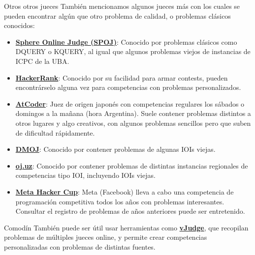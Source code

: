 \documentclass{beamer}
\begin{document}
    \begin{frame}{Otros otros jueces}
        También mencionamos algunos jueces más con los cuales se pueden encontrar algún que otro problema de calidad, o problemas clásicos conocidos: \pause

        \begin{itemize}
            \item \textbf{\textcolor{blue}{\href{https://www.spoj.com/}{Sphere Online Judge (SPOJ)}}}: Conocido por problemas clásicos como DQUERY o KQUERY, al igual que algunos problemas viejos de instancias de ICPC de la UBA.
            \item \textbf{\textcolor{blue}{\href{https://www.hackerrank.com/contests}{HackerRank}}}: Conocido por su facilidad para armar contests, pueden encontrárselo alguna vez para competencias con problemas personalizados.
            \item \textbf{\textcolor{blue}{\href{https://atcoder.jp/}{AtCoder}}}: Juez de origen japonés con competencias regulares los sábados o domingos a la mañana (hora Argentina). Suele contener problemas distintos a otros lugares y algo creativos, con algunos problemas sencillos pero que suben de dificultad rápidamente.
        \end{itemize}
    \end{frame}

    \begin{frame}[noframenumbering]
        \begin{itemize}
            \item \textbf{\textcolor{blue}{\href{https://dmoj.ca/}{DMOJ}}}: Conocido por contener problemas de algunas IOIs viejas.
            \item \textbf{\textcolor{blue}{\href{https://oj.uz/problems}{oj.uz}}}: Conocido por contener problemas de distintas instancias regionales de competencias tipo IOI, incluyendo IOIs viejas.
            \item \textbf{\textcolor{blue}{\href{https://www.facebook.com/codingcompetitions/hacker-cup/2019}{Meta Hacker Cup}}}: Meta (Facebook) lleva a cabo una competencia de programación competitiva todos los años con problemas interesantes. Consultar el registro de problemas de años anteriores puede ser entretenido.
        \end{itemize}
    \end{frame}

    \begin{frame}{Comodín}
        También puede ser útil usar herramientas como \textbf{\textcolor{blue}{\href{https://vjudge.net/}{vJudge}}}, que recopilan problemas de múltiples jueces online, y permite crear competencias personalizadas con problemas de distintas fuentes.
    \end{frame}
\end{document}

